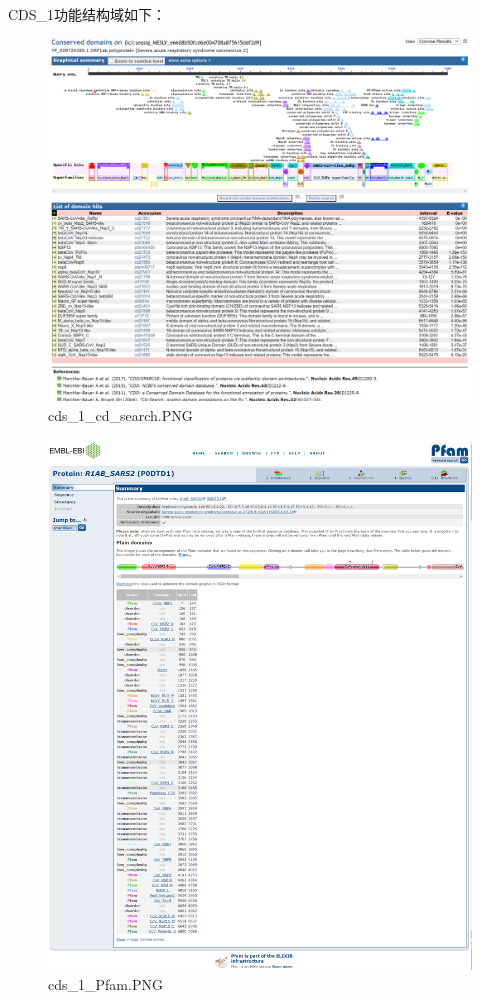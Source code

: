 \documentclass[supercite]{HustGraduPaper}
\begin{document}
	\paragraph{}\label{subpara:subpara}CDS\_1功能结构域如下：
	\begin{figure}[H]
		\centering
		\includegraphics[width=1\textwidth]{./material/practice2/cds_1/cd_search.png}
		\caption{cds\_1\_cd\_search.PNG}
	\end{figure}
	\begin{figure}[H]
		\centering
		\includegraphics[width=1\textwidth]{./material/practice2/cds_1/Pfam.png}
		\caption{cds\_1\_Pfam.PNG}
	\end{figure}
\end{document}
